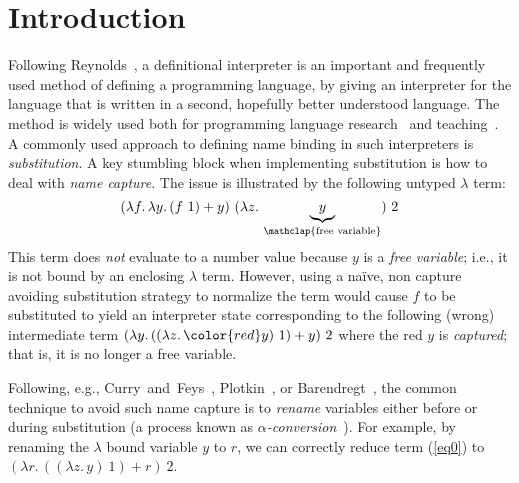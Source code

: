 \section{Introduction}


Following Reynolds~\cite{reynolds98definitional}, a definitional interpreter is an important and frequently used method of defining a programming language, by giving an interpreter for the language that is written in a second, hopefully better understood language.
The method is widely used both for programming language research~\cite{AminR17,bach2017intrinsically,Danielsson12-0,Owens2016functionalbigstep,RouvoetPKV20} and teaching~\cite{krishnamurthi2022plai,pierce2002types,siek2022essentials}.
A commonly used approach to defining name binding in such interpreters is \emph{substitution}.
A key stumbling block when implementing substitution is how to deal with \emph{name capture}.
The issue is illustrated by the following untyped $\lambda$ term:
\begin{equation}
  (\lambda f .\, \lambda y .\, (f\ 1) + y)\ (\lambda z .\, \underbrace{y}_{\mathclap{\text{free variable}}})\ 2
  \label{eq0}
\end{equation}
This term does \emph{not} evaluate to a number value because $y$ is a \emph{free variable}; i.e., it is not bound by an enclosing $\lambda$ term.
However, using a na\"{i}ve, non capture avoiding substitution strategy to normalize the term would cause $f$ to be substituted to yield an interpreter state corresponding to the following (wrong) intermediate term $(\lambda y .\, ((\lambda z .\, {\color{red} y})\ 1) + y)\ 2$ where the {\color{red} red $y$} is \emph{captured}; that is, it is no longer a free variable.

Following, e.g., Curry~and~Feys~\cite{curry1958combinatory}, Plotkin~\cite{Plotkin75}, or Barendregt~\cite{DBLP:books/daglib/0067558}, the common technique to avoid such name capture is to \emph{rename} variables either before or during substitution (a process known as \emph{$\alpha$-conversion}~\cite{church-unsolvableproblemof-1936}).
For example, by renaming the $\lambda$ bound variable $y$ to $r$, we can correctly reduce term (\ref{eq0}) to $(\lambda r .\, ((\lambda z .\, y)\ 1) + r)\ 2$.

